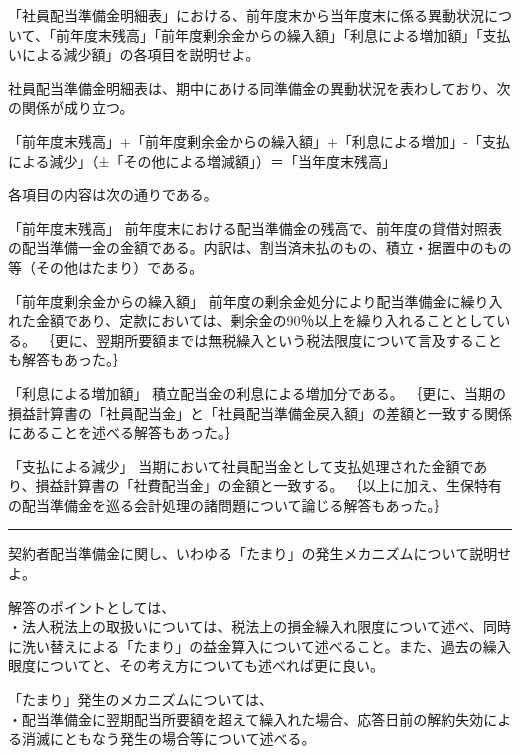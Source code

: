 \documentclass[report,gutter=10mm,fore-edge=10mm,uplatex,dvipdfmx]{jlreq}
\begin{document}

「社員配当準備金明細表」における、前年度末から当年度末に係る異動状況について、「前年度末残高」「前年度剰余金からの繰入額」「利息による増加額」「支払いによる減少額」の各項目を説明せよ。


社員配当準備金明細表は、期中にあける同準備金の異動状況を表わしており、次の関係が成り立つ。

「前年度末残高」+「前年度剰余金からの繰入額」+「利息による増加」-「支払による減少」（±「その他による増減額」）＝「当年度末残高」

各項目の内容は次の通りである。

「前年度末残高」 前年度末における配当準備金の残高で、前年度の貸借対照表の配当準備一金の金額である。内訳は、割当済未払のもの、積立・据置中のもの等（その他はたまり）である。

「前年度剰余金からの繰入額」 前年度の剰余金処分により配当準備金に繰り入れた金額であり、定款においては、剰余金の90％以上を繰り入れることとしている。
｛更に、翌期所要額までは無税繰入という税法限度について言及することも解答もあった。｝

「利息による増加額」 積立配当金の利息による増加分である。
｛更に、当期の損益計算書の「社員配当金」と「社員配当準備金戻入額」の差額と一致する関係にあることを述べる解答もあった。｝

「支払による減少」 当期において社員配当金として支払処理された金額であり、損益計算書の「社費配当金」の金額と一致する。
｛以上に加え、生保特有の配当準備金を巡る会計処理の諸問題について論じる解答もあった。｝

\begin{center}\rule{0.5\linewidth}{0.5pt}\end{center}


契約者配当準備金に関し、いわゆる「たまり」の発生メカニズムについて説明せよ。


解答のポイントとしては、\\
・法人税法上の取扱いについては、税法上の損金繰入れ限度について述べ、同時に洗い替えによる「たまり」の益金算入について述べること。また、過去の繰入眼度についてと、その考え方についても述べれば更に良い。

「たまり」発生のメカニズムについては、\\
・配当準備金に翌期配当所要額を超えて繰入れた場合、応答日前の解約失効による消滅にともなう発生の場合等について述べる。
\end{document}
